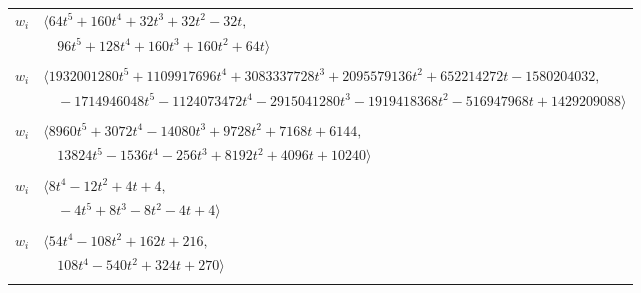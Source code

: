 \documentclass[11pt]{article}
\begin{document}
\begin{longtable}{@{}ll@{}}
$w_i$ & $\langle 64t^{5}+160t^{4}+32t^{3}+32t^{2}-32t,$\\
 & $\quad 96t^{5}+128t^{4}+160t^{3}+160t^{2}+64t\rangle$\\
\addlinespace[2pt]
\multicolumn{2}{@{}p{0.97\textwidth}@{}}{$i=58$, $D_i=262144$, $\rho_{ij}$: $3{:}2, \allowbreak 11{:}2, \allowbreak 14{:}2, \allowbreak 15{:}1, \allowbreak 18{:}2, \allowbreak 20{:}1, \allowbreak 21{:}2, \allowbreak 25{:}2, \allowbreak 28{:}1, \allowbreak 29{:}2, \allowbreak 30{:}1, \allowbreak 35{:}1, \allowbreak 39{:}1, \allowbreak 40{:}2, \allowbreak 42{:}2, \allowbreak 47{:}1, \allowbreak 56{:}1, \allowbreak 60{:}2, \allowbreak 63{:}1$}\\
$w_i$ & $\langle 1932001280t^{5}+1109917696t^{4}+3083337728t^{3}+2095579136t^{2}+652214272t-1580204032,$\\
 & $\quad -1714946048t^{5}-1124073472t^{4}-2915041280t^{3}-1919418368t^{2}-516947968t+1429209088\rangle$\\
\addlinespace[2pt]
\multicolumn{2}{@{}p{0.97\textwidth}@{}}{$i=59$, $D_i=256$, $\rho_{ij}$: $6{:}1, \allowbreak 20{:}1, \allowbreak 23{:}1, \allowbreak 32{:}2, \allowbreak 39{:}1, \allowbreak 40{:}2, \allowbreak 41{:}1, \allowbreak 44{:}2, \allowbreak 52{:}1, \allowbreak 55{:}2$}\\
$w_i$ & $\langle 8960t^{5}+3072t^{4}-14080t^{3}+9728t^{2}+7168t+6144,$\\
 & $\quad 13824t^{5}-1536t^{4}-256t^{3}+8192t^{2}+4096t+10240\rangle$\\
\addlinespace[2pt]
\multicolumn{2}{@{}p{0.97\textwidth}@{}}{$i=60$, $D_i=4$, $\rho_{ij}$: $3{:}1, \allowbreak 5{:}2, \allowbreak 6{:}1, \allowbreak 18{:}2, \allowbreak 32{:}1, \allowbreak 37{:}2, \allowbreak 52{:}1, \allowbreak 58{:}1$}\\
$w_i$ & $\langle 8t^{4}-12t^{2}+4t+4,$\\
 & $\quad -4t^{5}+8t^{3}-8t^{2}-4t+4\rangle$\\
\addlinespace[2pt]
\multicolumn{2}{@{}p{0.97\textwidth}@{}}{$i=61$, $D_i=18$, $e_i=0$, $\rho_{ij}$: $7{:}1, \allowbreak 8{:}1, \allowbreak 40{:}2, \allowbreak 47{:}2, \allowbreak 50{:}2$}\\
$w_i$ & $\langle 54t^{4}-108t^{2}+162t+216,$\\
 & $\quad 108t^{4}-540t^{2}+324t+270\rangle$\\
\addlinespace[2pt]
\multicolumn{2}{@{}p{0.97\textwidth}@{}}{$i=62$, $D_i=72$, $e_i=1$, $\rho_{ij}$: $6{:}1, \allowbreak 19{:}2, \allowbreak 35{:}1, \allowbreak 47{:}1, \allowbreak 50{:}1$}\\

\end{longtable}
\end{document}
